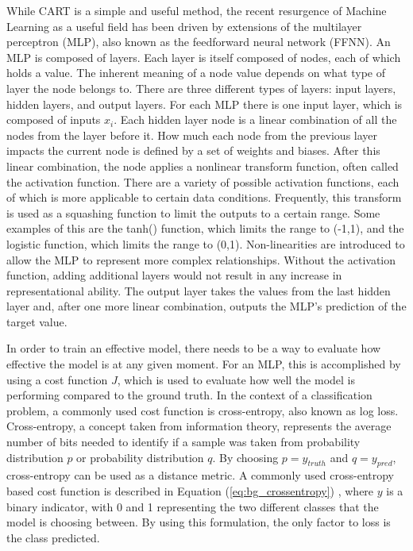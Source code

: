 	\par While CART is a simple and useful method, the recent resurgence of Machine Learning as a useful field has been driven by extensions of the multilayer perceptron (MLP)\cite{deepLearningSurvey}, also known as the feedforward neural network (FFNN). An MLP is composed of layers. Each layer is itself composed of nodes, each of which holds a value. The inherent meaning of a node value depends on what type of layer the node belongs to. There are three different types of layers: input layers, hidden layers, and output layers. For each MLP there is one input layer, which is composed of inputs $x_i$. Each hidden layer node is a linear combination of all the nodes from the layer before it. How much each node from the previous layer impacts the current node is defined by a set of weights and biases. After this linear combination, the node applies a nonlinear transform function, often called the activation function. There are a variety of possible activation functions, each of which is more applicable to certain data conditions. Frequently, this transform is used as a squashing function to limit the outputs to a certain range\cite{sigmoidReason}. Some examples of this are the tanh() function, which limits the range to (-1,1), and the logistic function, which limits the range to (0,1). Non-linearities are introduced to allow the MLP to represent more complex relationships. Without the activation function, adding additional layers would not result in any increase in representational ability. The output layer takes the values from the last hidden layer and, after one more linear combination, outputs the MLP's prediction of the target value. 
	\par In order to train an effective model, there needs to be a way to evaluate how effective the model is at any given moment. For an MLP, this is accomplished by using a cost function $J$, which is used to evaluate how well the model is performing compared to the ground truth. In the context of a classification problem, a commonly used cost function is cross-entropy, also known as log loss. Cross-entropy, a concept taken from information theory, represents the average number of bits needed to identify if a sample was taken from probability distribution $p$ or probability distribution $q$. By choosing $p=y_{truth}$ and $q=y_{pred}$, cross-entropy can be used as a distance metric. A commonly used cross-entropy based cost function is described in Equation (\ref{eq:bg_crossentropy}) \cite{lossFcns}, where $y$ is a binary indicator, with 0 and 1 representing the two different classes that the model is choosing between. By using this formulation, the only factor to loss is the class predicted. 
